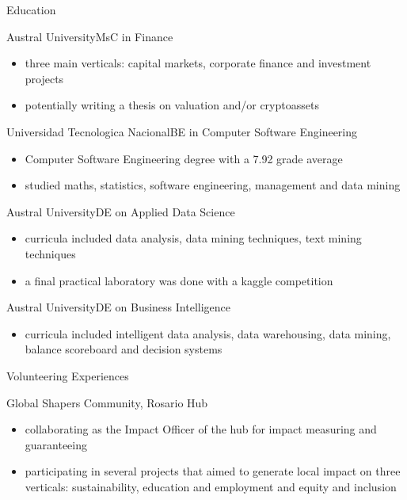 \documentclass{article}
\newlength{\tabin}
\newlength{\secsep}
\newcommand{\lineunder}{\vspace*{-8pt} \\ \hspace*{-6pt} \hrulefill \\ \vspace*{-15pt}}
\newenvironment{tabbedsection}[1]{
  \begin{list}{}{
      \setlength{\itemsep}{0pt}
      \setlength{\labelsep}{0pt}
      \setlength{\labelwidth}{0pt}
      \setlength{\leftmargin}{\tabin}
      \setlength{\rightmargin}{\tabin}
      \setlength{\listparindent}{0pt}
      \setlength{\parsep}{0pt}
      \setlength{\parskip}{0pt}
      \setlength{\partopsep}{0pt}
      \setlength{\topsep}{#1}
    }
  \item[]
}{\end{list}}
\newenvironment{resume_section}[1]{
  \filbreak
  \vspace{2\secsep}
  \textsc{\large#1}
  \lineunder
  \begin{tabbedsection}{\secsep}
}{\end{tabbedsection}}
\newenvironment{resume_subsection}[2][]{
  \textbf{#2} \hfill {\footnotesize #1} \hspace{2em}
  \begin{tabbedsection}{0.5\secsep}
}{\end{tabbedsection}}
\newenvironment{subitems}{
  \renewcommand{\labelitemi}{-}
  \begin{itemize}
      \setlength{\labelsep}{1em}
}{\end{itemize}}
\begin{document}
\begin{resume_section}{Education}
  \begin{resume_subsection}{Austral University}{MsC in Finance}
    \begin{subitems}
      \item three main verticals: capital markets, corporate finance and investment projects
      \item potentially writing a thesis on valuation and/or cryptoassets
    \end{subitems}
    \end{resume_subsection}
  \begin{resume_subsection}{Universidad Tecnologica Nacional}{BE in Computer Software Engineering}
    \begin{subitems}
      \item Computer Software Engineering degree with a 7.92 grade average
      \item studied maths, statistics, software engineering, management and data mining
    \end{subitems}
    \end{resume_subsection}
  \begin{resume_subsection}{Austral University}{DE on Applied Data Science}
    \begin{subitems}
      \item curricula included data analysis, data mining techniques, text mining techniques
      \item a final practical laboratory was done with a kaggle competition
    \end{subitems}
    \end{resume_subsection}
  \begin{resume_subsection}{Austral University}{DE on Business Intelligence}
    \begin{subitems}
      \item curricula included intelligent data analysis, data warehousing, data mining, balance scoreboard and decision systems
    \end{subitems}
  \end{resume_subsection}
\end{resume_section}

\begin{resume_section}{Volunteering Experiences}
  \begin{resume_subsection}{Global Shapers Community, Rosario Hub}
    \begin{subitems}  
      \item collaborating as the Impact Officer of the hub for impact measuring and guaranteeing
      \item participating in several projects that aimed to generate local impact on three verticals: sustainability, education and employment and equity and inclusion
    \end{subitems}
  \end{resume_subsection}
\end{resume_section}
\end{document}
